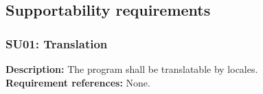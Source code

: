 \subsection{Supportability requirements}
\begin{adjustwidth}{2em}{0pt}

    \subsubsection*{SU01: Translation}
    \begin{adjustwidth}{1em}{0pt}
        \textbf{Description:}
        The program shall be translatable by locales.\\
        \textbf{Requirement references:}
        None.
    \end{adjustwidth}

\end{adjustwidth}
